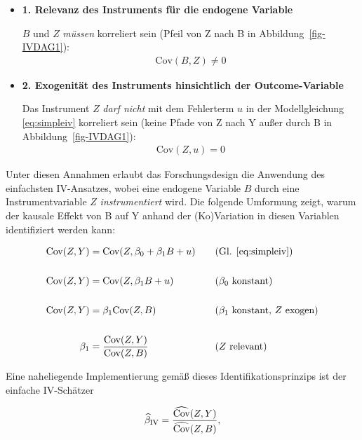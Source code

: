 \documentclass[
  a4paper,
  DIV=11,
  oneside]{scrreprt}
\begin{document}
\begin{itemize}
\item
  \textbf{1. Relevanz des Instruments für die endogene Variable}

  \(B\) und \(Z\) \emph{müssen} korreliert sein (Pfeil von Z nach B in
  Abbildung~\ref{fig-IVDAG1}): \begin{align}
      \text{Cov}(B,Z) \neq 0 \label{eq:ivassum1}
    \end{align}
\item
  \textbf{2. Exogenität des Instruments hinsichtlich der
  Outcome-Variable}

  Das Instrument \(Z\) \emph{darf nicht} mit dem Fehlerterm \(u\) in der
  Modellgleichung \eqref{eq:simpleiv} korreliert sein (keine Pfade von Z
  nach Y außer durch B in Abbildung~\ref{fig-IVDAG1}): \begin{align}
      \text{Cov}(Z,u) = 0 \label{eq:ivassum2}
    \end{align}
\end{itemize}

Unter diesen Annahmen erlaubt das Forschungsdesign die Anwendung des
einfachsten IV-Ansatzes, wobei eine endogene Variable \(B\) durch eine
Instrumentvariable \(Z\) \emph{instrumentiert} wird. Die folgende
Umformung zeigt, warum der kausale Effekt von B auf Y anhand der
(Ko)Variation in diesen Variablen identifiziert werden kann:

\begin{alignat*}{2}
  \textup{Cov}(Z,Y) &= \textup{Cov}(Z,\beta_0 + \beta_1 B + u) &\quad& \text{(Gl. \eqref{eq:simpleiv})} \\
  \\
  \textup{Cov}(Z,Y) &= \textup{Cov}(Z, \beta_1 B + u) &\quad& \text{($\beta_0$ konstant)} \\
  \\
  \textup{Cov}(Z,Y) &= \beta_1\textup{Cov}(Z,B) &\quad& \text{($\beta_1$ konstant, $Z$ exogen)} \\
  \\
  \beta_1 &= \frac{\textup{Cov}(Z,Y) }{\textup{Cov}(Z,B)} &\quad& \text{($Z$ relevant)}
\end{alignat*}

Eine naheliegende Implementierung gemäß dieses Identifikationsprinzips
ist der einfache IV-Schätzer

\begin{align}
  \widehat{\beta}_{\textup{IV}} = \frac{\widehat{\textup{Cov}}(Z,Y) }{\widehat{\textup{Cov}}(Z,B)}, \label{eq:simpleivest}
\end{align}
\end{document}
